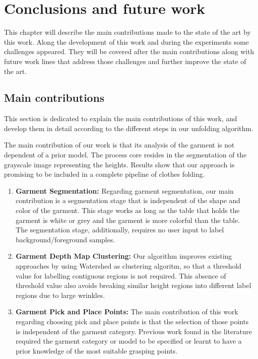 \chapter{Conclusions and future work}
\label{conclusions_and_future_work}

This chapter will describe the main contributions made to the state of the art by this work. Along the development of this work and during the experiments some challenges appeared. They will be covered after the main contributions along with future work lines that address those challenges and  further improve the state of the art.


\section {Main contributions}
\label{conclusions:contributions}

This section is dedicated to explain the main contributions of this work, and develop them in detail according to the different steps in our unfolding algorithm.

The main contribution of our work is that its analysis of the garment is not dependent of a prior model. The process core resides in the segmentation of the grayscale image representing the heights. Results show that our approach is promising to be included in a complete pipeline of clothes folding.

\begin{enumerate}
	\item \textbf{Garment Segmentation:} Regarding garment segmentation, our main contribution is a segmentation stage that is independent of the shape and color of the garment. This stage works as long as the table that holds the garment is white or grey and the garment is more colorful than the table. The segmentation stage, additionally, requires no user input to label background/foreground samples.
	\item \textbf{Garment Depth Map Clustering:} Our algorithm improves existing approaches by using Watershed as clustering algoritm, so that a threshold value for labelling contiguous regions is not required. This absence of threshold value also avoids breaking similar height regions into different label regions due to large wrinkles. 
	\item \textbf{Garment Pick and Place Points:} The main contribution of this work regarding   choosing pick and place points is that the selection of those points is independent of the garment category. Previous work found in the literature required the garment category or model to be specified or learnt to have a prior knowledge of the most suitable grasping points.
\end{enumerate}


